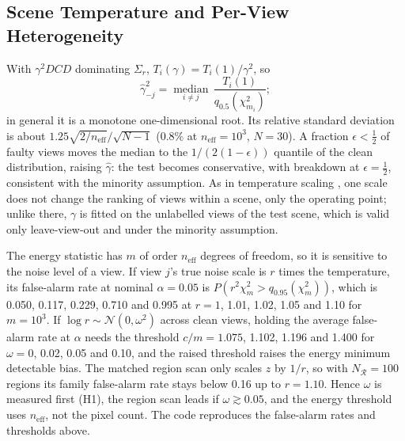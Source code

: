 \subsection{Scene Temperature and Per-View Heterogeneity}
With $\gamma^{2}DCD$ dominating $\Sigma_r$, $T_i(\gamma)=T_i(1)/\gamma^{2}$, so
\[
\hat\gamma^{2}_{-j}=\operatorname*{median}_{i\ne j}\,\frac{T_i(1)}{q_{0.5}(\chi^{2}_{m_i})};
\]
in general it is a monotone one-dimensional root. Its relative standard deviation is about $1.25\sqrt{2/n_{\mathrm{eff}}}/\sqrt{N-1}$
(0.8\% at $n_{\mathrm{eff}}=10^{3}$, $N=30$). A fraction $\epsilon<\tfrac12$ of faulty views moves the
median to the $1/(2(1-\epsilon))$ quantile of the clean distribution, raising $\hat\gamma$: the test
becomes conservative, with breakdown at $\epsilon=\tfrac12$, consistent with the minority assumption.
As in temperature scaling \cite{cal_guo_temperature}, one scale does not change the ranking of views
within a scene, only the operating point; unlike there, $\gamma$ is fitted on the unlabelled views of
the test scene, which is valid only leave-view-out and under the minority assumption.

The energy statistic has $m$ of order $n_{\mathrm{eff}}$ degrees of freedom, so it is sensitive to the
noise level of a view. If view $j$'s true noise scale is $r$ times the temperature, its false-alarm rate
at nominal $\alpha=0.05$ is $P(r^{2}\chi^{2}_m>q_{0.95}(\chi^{2}_m))$, which is 0.050, 0.117, 0.229, 0.710
and 0.995 at $r=1$, 1.01, 1.02, 1.05 and 1.10 for $m=10^{3}$. If $\log r\sim\mathcal{N}(0,\omega^{2})$
across clean views, holding the average false-alarm rate at $\alpha$ needs the threshold
$c/m=1.075$, 1.102, 1.196 and 1.400 for $\omega=0$, 0.02, 0.05 and 0.10, and the raised threshold raises
the energy minimum detectable bias. The matched region scan only scales $z$ by $1/r$, so with
$N_{\mathcal{R}}=100$ regions its family false-alarm rate stays below 0.16 up to $r=1.10$. Hence $\omega$ is
measured first (H1), the region scan leads if $\omega\gtrsim0.05$, and the energy threshold uses
$n_{\mathrm{eff}}$, not the pixel count. The code reproduces the false-alarm rates and thresholds above.

